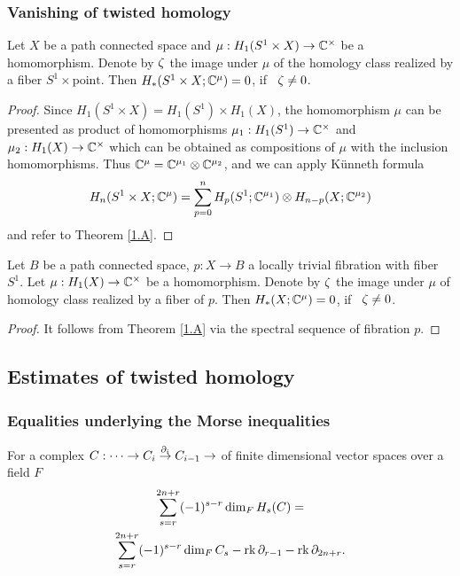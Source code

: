 \documentclass{article}
\numberwithin{equation}{section}
\begin{document}
\subsubsection{Vanishing of twisted homology}\label{sT.2.2} 
\begin{Acor}\label{1.B}
Let $X$ be a path connected space and 
$\mu:H_1(S^1\times X)\to\mathbb C^\times$ be a homomorphism. 
Denote by $\zeta$ the image under $\mu$ of the homology class 
realized by a fiber $S^1\times \text{point}$. 
Then $H_*(S^1\times X;\mathbb C^\mu)=0$, if \
 $\zeta\ne0$. 
\end{Acor}

\begin{proof} Since $H_1(S^1\times X)=H_1(S^1)\times H_1(X)$, the
homomorphism $\mu$ can be presented as product of homomorphisms
$\mu_1:H_1(S^1)\to\mathbb C^\times$ and $\mu_2:H_1(X)\to\mathbb C^\times$ which 
can be obtained
as compositions of $\mu$ with the inclusion homomorphisms. Thus
$\mathbb C^\mu=\mathbb C^{\mu_1}\otimes\mathbb C^{\mu_2}$, and we can apply K\"unneth
formula 
$$H_n(S^1\times X;\mathbb C^\mu)=\sum_{p=0}^n H_p(S^1;\mathbb C^{\mu_1})\otimes
H_{n-p}(X;\mathbb C^{\mu_2})$$
and refer to Theorem \ref{1.A}.
\end{proof}

\begin{Acor}\label{1.C}
Let $B$ be a path connected space, $p:X\to B$ a locally trivial
fibration with fiber $S^1$. Let $\mu:H_1(X)\to\mathbb C^\times$ be
a homomorphism. Denote by $\zeta$ the image under $\mu$ of homology class 
realized by a fiber of $p$. Then $H_*(X;\mathbb C^\mu)=0$, if \
 $\zeta\ne0$. 
\end{Acor}

\begin{proof} It follows from Theorem \ref{1.A} via the spectral sequence of
fibration $p$. 
\end{proof}

\subsection{Estimates of twisted homology}\label{sT.3} 
\vspace{6pt}

\subsubsection{Equalities underlying the Morse inequalities}\label{sT.3.1}
\begin{Alem}\label{EqUnderlMI}
For a complex $C:\dots\to C_i\overset{\partial_i}\to
C_{i-1}\to$ of finite dimensional vector spaces
over a field $F$
\begin{multline}\label{dimH}
 \sum_{s=r}^{2n+r}(-1)^{s-r}\dim_FH_s(C)=\\
 \sum_{s=r}^{2n+r}(-1)^{s-r}\dim_FC_s-\operatorname{rk}\partial_{r-1}-\operatorname{rk}\partial_{2n+r}.
\end{multline}  
\end{Alem}
\end{document}

